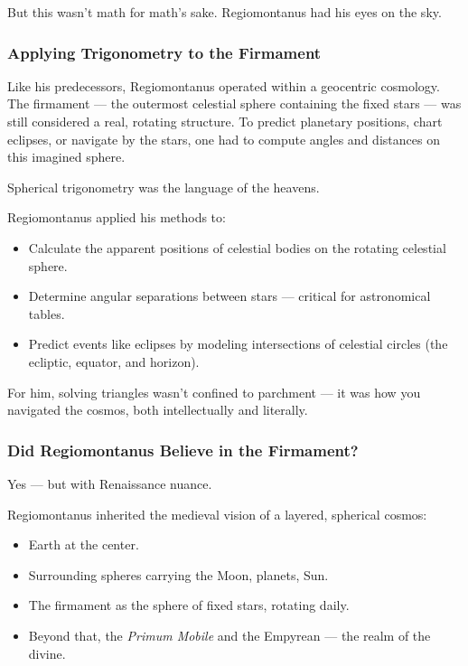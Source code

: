 But this wasn’t math for math’s sake. Regiomontanus had his eyes on the sky.

\subsubsection*{Applying Trigonometry to the Firmament}

Like his predecessors, Regiomontanus operated within a geocentric cosmology. The firmament — the outermost celestial sphere containing the fixed stars — was still considered a real, rotating structure. To predict planetary positions, chart eclipses, or navigate by the stars, one had to compute angles and distances on this imagined sphere.

Spherical trigonometry was the language of the heavens.

Regiomontanus applied his methods to:

\begin{itemize}
  \item Calculate the apparent positions of celestial bodies on the rotating celestial sphere.
  \item Determine angular separations between stars — critical for astronomical tables.
  \item Predict events like eclipses by modeling intersections of celestial circles (the ecliptic, equator, and horizon).
\end{itemize}

For him, solving triangles wasn’t confined to parchment — it was how you navigated the cosmos, both intellectually and literally.

\subsubsection*{Did Regiomontanus Believe in the Firmament?}

Yes — but with Renaissance nuance.

Regiomontanus inherited the medieval vision of a layered, spherical cosmos:

\begin{itemize}
  \item Earth at the center.
  \item Surrounding spheres carrying the Moon, planets, Sun.
  \item The firmament as the sphere of fixed stars, rotating daily.
  \item Beyond that, the \textit{Primum Mobile} and the Empyrean — the realm of the divine.
\end{itemize}

